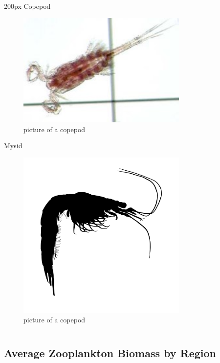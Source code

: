 \documentclass[
]{book}
\begin{document}
\begin{column}{200px\textwidth}
Copepod

\begin{figure}

{\centering \includegraphics[width=3.31in]{figures/copepod} 

}

\caption{picture of a copepod}\label{fig:unnamed-chunk-162}
\end{figure}

Mysid

\begin{figure}

{\centering \includegraphics[width=3.31in]{figures/mysid} 

}

\caption{picture of a copepod}\label{fig:unnamed-chunk-163}
\end{figure}
\end{column}

\hypertarget{average-zooplankton-biomass-by-region-3}{%
\subsection{Average Zooplankton Biomass by Region}\label{average-zooplankton-biomass-by-region-3}}
\end{document}
